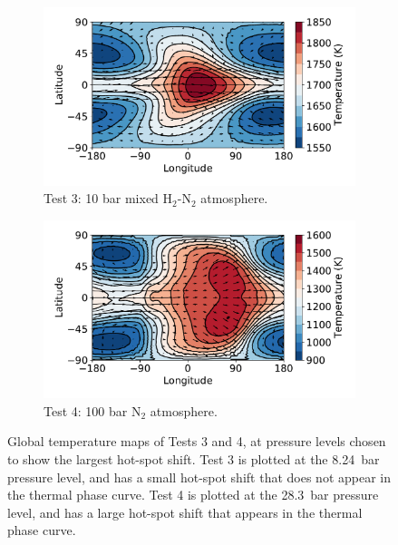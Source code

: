 \begin{figure}
  \centering
  \begin{subfigure}[t]{0.48\textwidth}
    \includegraphics[width=\textwidth]{figures/soc-lava-planets/h2n2-soc-temp.pdf}
    \caption{Test 3: 10 bar mixed H$_{2}$-N$_{2}$ atmosphere.}\label{fig:soc-temp-h2n2}
  \end{subfigure}
\quad
  \begin{subfigure}[t]{0.48\textwidth}
    \includegraphics[width=\textwidth]{figures/soc-lava-planets/n2-100bar-soc-temp.pdf}
    \caption{Test 4: 100 bar N$_{2}$ atmosphere.}\label{fig:soc-temp-n2-100bar}
  \end{subfigure}
  \caption{Global temperature maps of Tests 3 and 4, at pressure levels chosen to show the largest hot-spot shift. Test 3 is plotted at the \SI{8.24}{\bar} pressure level, and has a small hot-spot shift that does not appear in the thermal phase curve. Test 4 is plotted at the \SI{28.3}{\bar} pressure level, and has a large hot-spot shift that appears in the thermal phase curve.}
  \label{fig:soc-temp-best}
\end{figure}


